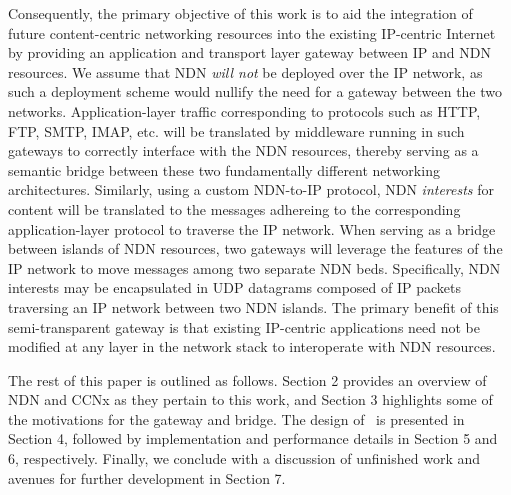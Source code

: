 Consequently, the primary objective of this work is to aid the integration of future content-centric networking resources into the existing IP-centric Internet by providing an application and transport layer gateway between IP and NDN resources. We assume that NDN \emph{will not} be deployed over the IP network, as such a deployment scheme would nullify the need for a gateway between the two networks. Application-layer traffic corresponding to protocols such as HTTP, FTP, SMTP, IMAP, etc. will be translated by middleware running in such gateways to correctly interface with the NDN resources, thereby serving as a semantic bridge between these two fundamentally different networking architectures. Similarly, using a custom NDN-to-IP protocol, NDN \emph{interests} for content will be translated to the messages adhereing to the corresponding application-layer protocol to traverse the IP network. When serving as a bridge between islands of NDN resources, two gateways will leverage the features of the IP network to move messages among two separate NDN beds. Specifically, NDN interests may be encapsulated in UDP datagrams composed of IP packets traversing an IP network between two NDN islands. The primary benefit of this semi-transparent gateway is that existing IP-centric applications need not be modified at any layer in the network stack to interoperate with NDN resources. 

The rest of this paper is outlined as follows. Section 2 provides an overview of NDN and CCNx as they pertain to this work, and Section 3 highlights some of the motivations for the gateway and bridge. The design of \sink\ is presented in Section 4, followed by implementation and performance details in Section 5 and 6, respectively. Finally, we conclude with a discussion of unfinished work and avenues for further development in Section 7. 





